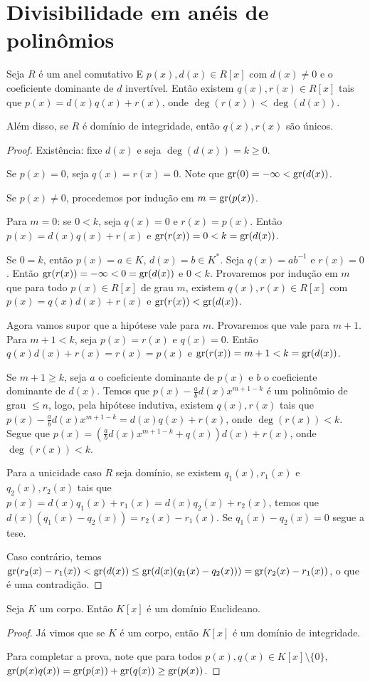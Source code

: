 \section{Divisibilidade em anéis de polinômios}
\begin{prop}\label{prop:polinomio_Euclideano}
Seja $R$ é um anel comutativo E $p(x), d(x) \in R[x]$ com $d(x)\neq 0$ e o coeficiente dominante de $d$ invertível. Então existem $q(x), r(x) \in R[x]$ tais que $p(x)=d(x)q(x)+r(x)$, onde $\deg(r(x))<\deg(d(x))$.

Além disso, se $R$ é domínio de integridade, então $q(x), r(x)$ são únicos.
\end{prop}
\begin{proof}
    Existência: fixe $d(x)$ e seja $\deg(d(x))=k\geq 0$.

    Se $p(x)=0$, seja $q(x)=r(x)=0$. Note que $\operatorname{gr}(0)=-\infty<\operatorname{gr}(d(x))$.

    Se $p(x)\neq 0$, procedemos por indução em $m=\operatorname{gr}(p(x))$.

    Para $m=0$: se $0<k$, seja $q(x)=0$ e $r(x)=p(x)$. Então $p(x)=d(x)q(x)+r(x)$ e $\operatorname{gr}(r(x))=0<k=\operatorname{gr}(d(x))$.

    Se $0=k$, então $p(x)=a\in K$, $d(x)=b\in K^*$. Seja $q(x)=ab^{-1}$ e $r(x)=0$. Então $\operatorname{gr}(r(x))=-\infty<0=\operatorname{gr}(d(x))$ e $0<k$.
    Provaremos por indução em $m$ que para todo $p(x)\in R[x]$ de grau $m$, existem $q(x), r(x) \in R[x]$ com $p(x)=q(x)d(x)+r(x)$ e $\operatorname{gr}(r(x))<\operatorname{gr}(d(x))$.

    Agora vamos supor que a hipótese vale para $m$. Provaremos que vale para $m+1$.
    Para $m+1<k$, seja $p(x)=r(x)$ e $q(x)=0$. Então $q(x)d(x)+r(x)=r(x)=p(x)$ e $\operatorname{gr}(r(x))=m+1<k=\operatorname{gr}(d(x))$.

    Se $m+1\geq k$, seja $a$ o coeficiente dominante de $p(x)$ e $b$ o coeficiente dominante de $d(x)$.
    Temos que $p(x)-\frac{a}{b}d(x)x^{m+1-k}$ é um polinômio de grau $\leq n$, logo, pela hipótese indutiva, existem $q(x), r(x)$ tais que $p(x)-\frac{a}{b}d(x)x^{m+1-k}=d(x)q(x)+r(x)$, onde $\deg(r(x))<k$.
    Segue que $p(x)=\left(\frac{a}{b}d(x)x^{m+1-k}+q(x)\right)d(x)+r(x)$, onde $\deg(r(x))<k$.

    Para a unicidade caso $R$ seja domínio, se existem $q_1(x), r_1(x)$ e $q_2(x), r_2(x)$ tais que $p(x)=d(x)q_1(x)+r_1(x)=d(x)q_2(x)+r_2(x)$, temos que $d(x)(q_1(x)-q_2(x))=r_2(x)-r_1(x)$.
    Se $q_1(x)-q_2(x)=0$ segue a tese.

    Caso contrário, temos $\operatorname{gr}(r_2(x)-r_1(x))<\operatorname{gr}(d(x))\leq\operatorname{gr}(d(x)(q_1(x)-q_2(x)))=\operatorname{gr}(r_2(x)-r_1(x))$, o que é uma contradição.
\end{proof}
\begin{corol}
Seja $K$ um corpo. Então $K[x]$ é um domínio Euclideano.
\end{corol}
\begin{proof}
Já vimos que se $K$ é um corpo, então $K[x]$ é um domínio de integridade.

Para completar a prova, note que para todos $p(x), q(x) \in K[x]\setminus \{0\}$, $\operatorname{gr}(p(x)q(x))=\operatorname{gr}(p(x))+\operatorname{gr}(q(x))\geq \operatorname{gr}(p(x))$.
\end{proof}

